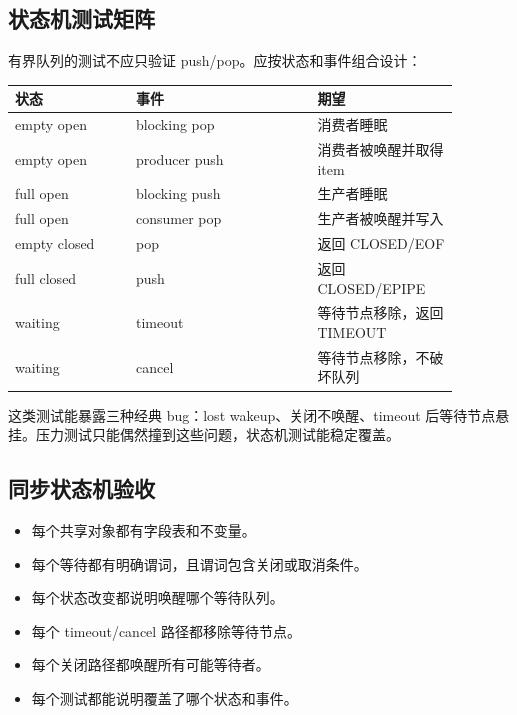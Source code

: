 \subsection{状态机测试矩阵}

有界队列的测试不应只验证 push/pop。应按状态和事件组合设计：

\begin{longtable}{|p{0.24\linewidth}|p{0.36\linewidth}|p{0.28\linewidth}|}
\toprule
状态 & 事件 & 期望 \\
\midrule
empty open & blocking pop & 消费者睡眠 \\\tablerowrule
empty open & producer push & 消费者被唤醒并取得 item \\\tablerowrule
full open & blocking push & 生产者睡眠 \\\tablerowrule
full open & consumer pop & 生产者被唤醒并写入 \\\tablerowrule
empty closed & pop & 返回 CLOSED/EOF \\\tablerowrule
full closed & push & 返回 CLOSED/EPIPE \\\tablerowrule
waiting & timeout & 等待节点移除，返回 TIMEOUT \\\tablerowrule
waiting & cancel & 等待节点移除，不破坏队列 \\
\bottomrule
\end{longtable}

这类测试能暴露三种经典 bug：lost wakeup、关闭不唤醒、timeout 后等待节点悬挂。压力测试只能偶然撞到这些问题，状态机测试能稳定覆盖。

\subsection{同步状态机验收}

\begin{itemize}
\tightlist
\item 每个共享对象都有字段表和不变量。
\item 每个等待都有明确谓词，且谓词包含关闭或取消条件。
\item 每个状态改变都说明唤醒哪个等待队列。
\item 每个 timeout/cancel 路径都移除等待节点。
\item 每个关闭路径都唤醒所有可能等待者。
\item 每个测试都能说明覆盖了哪个状态和事件。
\end{itemize}
